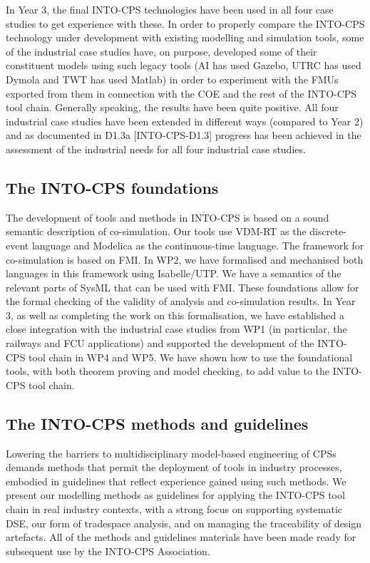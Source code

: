 In Year 3, the final INTO-CPS technologies have been used in all four case studies to get experience with these. In order to properly compare the INTO-CPS technology under development with existing modelling and simulation tools, some of the industrial case studies have, on purpose, developed some of their constituent models using such legacy tools (AI has used Gazebo, UTRC has used Dymola and TWT has used Matlab) in order to experiment with the FMUs exported from them in connection with the COE and the rest of the INTO-CPS tool chain. Generally speaking, the results have been quite positive. All four industrial case studies have been extended in different ways (compared to Year 2) and as documented in D1.3a [INTO-CPS-D1.3] progress has been achieved in the assessment of the industrial needs for all four industrial case studies.

\subsection{The INTO-CPS foundations}

The development of tools and methods in INTO-CPS is based on a sound semantic description of co-simulation. Our tools use VDM-RT as the discrete-event language and Modelica as the continuous-time language. The framework for co-simulation is based on FMI. In WP2, we have formalised and mechanised both languages in this framework using Isabelle/UTP. We have a semantics of the relevant parts of SysML that can be used with FMI. These foundations allow for the formal checking of the validity of analysis and co-simulation results. In Year 3, as well as completing the work on this formalisation, we have established a close integration with the industrial case studies from WP1 (in particular, the railways and FCU applications) and supported the development of the INTO-CPS tool chain in WP4 and WP5. We have shown how to use the foundational tools, with both theorem proving and model checking, to add value to the INTO-CPS tool chain.

\subsection{The INTO-CPS methods and guidelines}

Lowering the barriers to multidisciplinary model-based engineering of CPSs demands methods that permit the deployment of tools in industry processes, embodied in guidelines that reflect experience gained using such methods. We present our modelling methods as guidelines for applying the INTO-CPS tool chain in real industry contexts, with a strong focus on supporting systematic DSE, our form of tradespace analysis, and on managing the traceability of design artefacts. All of the methods and guidelines materials have been made ready for subsequent use by the INTO-CPS Association.  

